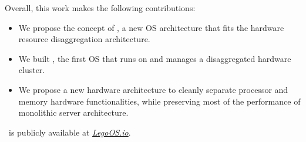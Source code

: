 Overall, this work makes the following contributions:

\begin{itemize}

\item We propose the concept of \splitkernel, a new OS architecture that fits the hardware resource disaggregation architecture.

\item We built \lego, the first OS that runs on and manages a disaggregated hardware cluster.

\item We propose a new hardware architecture to cleanly separate processor and memory hardware functionalities, 
while preserving most of the performance of monolithic server architecture.

\end{itemize}

\lego\ is publicly available at {\small {\em {\url{LegoOS.io}}}}.\\
